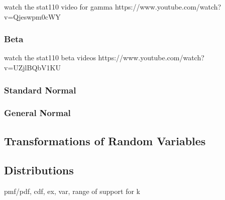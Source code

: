 \documentclass[a4paper,10pt]{article}
\begin{document}
{\huge watch the stat110 video for gamma https://www.youtube.com/watch?v=Qjeswpm0cWY}

\subsubsection{Beta}

{\huge watch the stat110 beta videos https://www.youtube.com/watch?v=UZjlBQbV1KU}

\subsubsection{Standard Normal}

\subsubsection{General Normal}

\subsection{Transformations of Random Variables}

\subsection{Distributions}
pmf/pdf, cdf, ex, var, range of support for k
\end{document}
